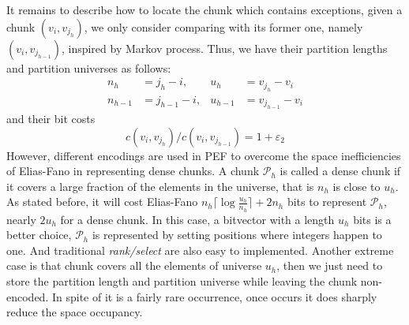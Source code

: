\documentclass[runningheads]{comsis2}
\begin{document}
It remains to describe how to locate the chunk which contains exceptions, given a chunk $\left(v_{i}, v_{j_{h}}\right)$, we only consider comparing with its former one, namely $\left(v_{i}, v_{j_{h-1}}\right)$, inspired by Markov process.
Thus, we have their partition lengths and partition universes as follows:
\begin{align}
n_{h} &= j_{h}-i, & u_{h} &= v_{j_{h}} - v_{i} \label{equ:chunk h}\\
n_{h-1} &= j_{h-1}-i, & u_{h-1} &= v_{j_{h-1}} - v_{i}\label{equ:chunk h-1}
\end{align}
and their bit costs
\begin{equation}\label{equ:cost ratio}
{c\left(v_{i}, v_{j_{h}}\right)}/{c\left(v_{i}, v_{j_{h-1}}\right)}=1+\varepsilon_{2}
\end{equation}
However, different encodings are used in PEF to overcome the space inefficiencies of Elias-Fano in representing dense chunks.
A chunk $ \mathcal{P}_{h} $ is called a dense chunk if it covers a large fraction of the elements in the universe, that is $ n_{h} $ is close to $ u_{h} $.
As stated before, it will cost Elias-Fano $ n_{h} \lceil \log \frac{u_{h}}{n_{h}} \rceil + 2 n_{h} $ bits to represent $ \mathcal{P}_{h} $, nearly $ 2 u_{h} $ for a dense chunk.
In this case, a bitvector with a length $ u_{h} $ bits is a better choice, $ \mathcal{P}_{h} $ is represented by setting positions where integers happen to one.
And traditional \textit{rank/select} are also easy to implemented.
Another extreme case is that chunk covers all the elements of universe $ u_{h} $, then we just need to store the partition length and partition universe while leaving the chunk non-encoded.
In spite of it is a fairly rare occurrence, once occurs it does sharply reduce the space occupancy.
\end{document}
